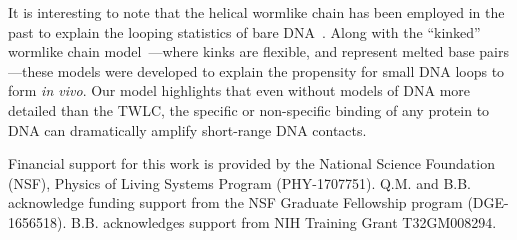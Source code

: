 \documentclass[%
 reprint,
superscriptaddress,
showpacs,preprintnumbers,
 amsmath,amssymb,
 aps,
 prl,
]{revtex4-1}
\begin{document}
It is interesting to note that the helical wormlike chain has been employed
    in the past to explain the looping statistics of bare DNA~\cite{shimada1984,
    liu2011a}.
Along with the ``kinked'' wormlike chain model~\cite{wiggins2005,
    popov2005}---where kinks are flexible, and represent melted base
    pairs---these models were developed to explain the propensity for small DNA
    loops to form \textit{in vivo}.
Our model highlights that even without models of DNA more detailed than the
    TWLC, the specific or non-specific binding of any protein to DNA can
    dramatically amplify short-range DNA contacts.\@

\begin{acknowledgements}
Financial support for this work is provided by the National Science Foundation
    (NSF), Physics of Living Systems Program (PHY-1707751). Q.M. and B.B.
    acknowledge funding support from the NSF Graduate Fellowship program
    (DGE-1656518). B.B. acknowledges support from NIH Training Grant
    T32GM008294.
\end{acknowledgements}


\end{document}
